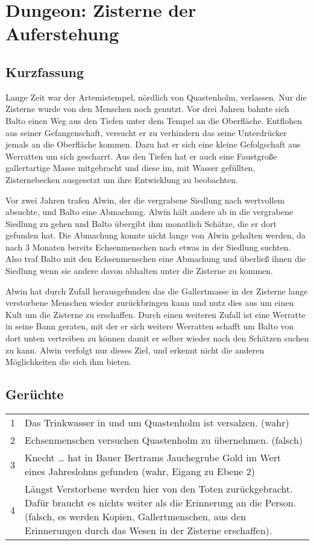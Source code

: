 \section{Dungeon: Zisterne der Auferstehung}

\subsection{Kurzfassung}

Lange Zeit war der Artemistempel, nördlich von Quastenholm,
verlassen. Nur die Zisterne wurde von den Menschen noch genutzt. Vor
drei Jahren bahnte sich Balto einen Weg aus den Tiefen unter dem Tempel
an die Oberfläche. Entflohen aus seiner Gefangenschaft, versucht er zu
verhindern das seine Unterdrücker jemals an die Oberfläche kommen. Dazu
hat er sich eine kleine Gefolgschaft aus Werratten um sich gescharrt. Aus
den Tiefen hat er auch eine Faustgroße gallertartige Masse mitgebracht
und diese im, mit Wasser gefüllten, Zisternebecken ausgesetzt um ihre
Entwicklung zu beobachten.

Vor zwei Jahren trafen Alwin, der die vergrabene Siedlung nach
wertvollem absuchte, und Balto eine Abmachung. Alwin hält andere ab
in die vergrabene Siedlung zu gehen und Balto übergibt ihm monatlich
Schätze, die er dort gefunden hat. Die Abmachung konnte nicht lange von
Alwin gehalten werden, da nach 3 Monaten bereits Echsenmenschen nach
etwas in der Siedlung suchten. Also traf Balto mit den Echsenmenschen
eine Abmachung und überließ ihnen die Siedlung wenn sie andere davon
abhalten unter die Zisterne zu kommen.

Alwin hat durch Zufall herausgefunden das die Gallertmasse in der Zisterne
lange verstorbene Menschen wieder zurückbringen kann und nutz dies aus um
einen Kult um die Zisterne zu erschaffen. Durch einen weiteren Zufall ist
eine Werratte in seine Bann geraten, mit der er sich weitere Werratten
schafft um Balto von dort unten vertreiben zu können damit er selber
wieder nach den Schätzen suchen zu kann. Alwin verfolgt nur dieses Ziel,
und erkennt nicht die anderen Möglichkeiten die sich ihm bieten.

\subsection{Gerüchte}

\begin{tabularx}{\columnwidth}{cZ}
1 & Das Trinkwasser in und um Quastenholm ist versalzen. (wahr) \\
2 & Echsenmenschen versuchen Quastenholm zu übernehmen. (falsch) \\
3 & Knecht … hat in Bauer Bertrams Jauchegrube Gold im Wert eines 
    Jahreslohns gefunden (wahr, Eigang zu Ebene 2) \\
4 & Längst Verstorbene werden hier von den Toten zurückgebracht.
    Dafür braucht es nichts weiter als die Erinnerung an die Person. 
    (falsch, es werden Kopien, Gallertmenschen, aus den Erinnerungen 
    durch das Wesen in der Zisterne erschaffen). \\
\end{tabularx}

